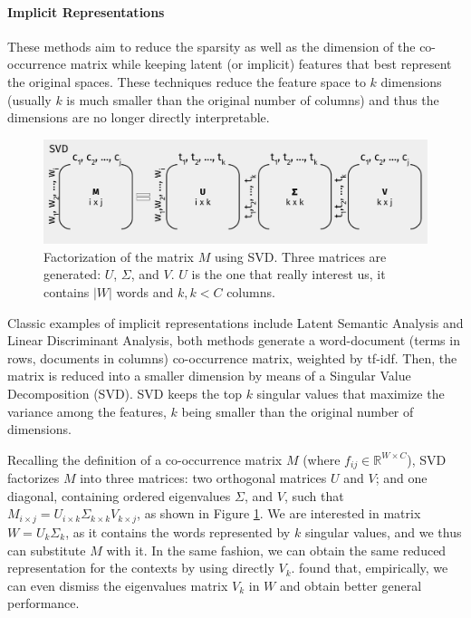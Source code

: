 \paragraph{Implicit Representations}
These methods aim to reduce the sparsity as well as the dimension of the co-occurrence matrix while keeping latent (or implicit) features that best represent the original spaces. These techniques reduce the feature space to $k$ dimensions (usually $k$ is much smaller than the original number of columns) and thus the dimensions  are no longer directly interpretable.

\begin{figure}
\centering
\includegraphics[width=.8\linewidth]{images/Chapitre2/svd.pdf}
\caption{Factorization of the matrix $M$ using SVD. Three matrices are generated: $U$, $\Sigma$, and $V$. $U$ is the one that really interest us, it contains $|W|$ words and $k, k<C$ columns.}
\label{fig:svd}
\end{figure}

Classic examples of implicit representations include Latent Semantic Analysis and Linear Discriminant Analysis, both methods generate a word-document (terms in rows, documents in columns) co-occurrence matrix, weighted by tf-idf. Then, the matrix is reduced into a smaller dimension by means of a Singular Value Decomposition (SVD). SVD keeps the top $k$ singular values that maximize the variance among the features, $k$ being smaller than the original number of dimensions.

Recalling  the  definition of a co-occurrence matrix $M$ (where $f_{ij} \in \mathbb{R}^{W\times C}$), SVD factorizes $M$ into three matrices: two orthogonal matrices $U$ and $V$; and one diagonal, containing ordered eigenvalues $\Sigma$, and $V$, such that $M_{i\times j} = U_{i\times k}\Sigma_{k\times k}V_{k\times j}$, as shown in Figure \ref{fig:svd}. We are interested in matrix $W= U_k\Sigma_k$, as it  contains the words represented by $k$ singular values, and we thus can substitute $M$ with it. In the same fashion, we can obtain the same reduced representation for the contexts by using directly $V_k$. \cite{levy2015improving} found that, empirically, we can even dismiss the eigenvalues matrix $V_k$ in $W$ and obtain better general performance.

